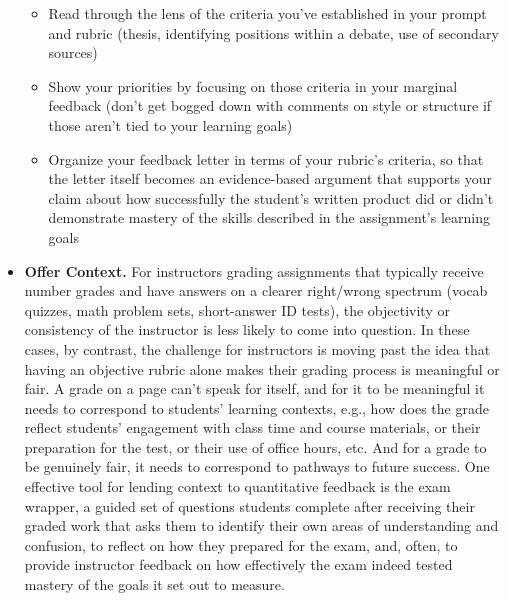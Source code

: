 \begin{itemize}
  \begin{itemize}
  \item Read through the lens of the criteria you’ve established in your prompt and rubric (thesis, identifying positions within a debate, use of secondary sources)
    
  \item Show your priorities by focusing on those criteria in your marginal feedback (don’t get bogged down with comments on style or structure if those aren’t tied to your learning goals)
    
  \item Organize your feedback letter in terms of your rubric’s criteria, so that the letter itself becomes an evidence-based argument that supports your claim about how successfully the student's written product  did or didn’t demonstrate mastery of the skills described in the assignment’s learning goals
  \end{itemize}
  
\item \textbf{Offer Context.} For instructors grading assignments that typically receive number grades and have answers on a clearer right/wrong spectrum (vocab quizzes, math problem sets, short-answer ID tests), the objectivity or consistency of the instructor is less likely to come into question. In these cases, by contrast, the challenge for instructors is moving past the idea that having an objective rubric alone makes their grading process is meaningful or fair. A grade on a page can’t speak for itself, and for it to be meaningful it needs to correspond to students’ learning contexts, e.g., how does the grade reflect students’ engagement with class time and course materials, or their preparation for the test, or their use of office hours, etc. And for a grade to be genuinely fair, it needs to correspond to pathways to future success. One effective tool for lending context to quantitative feedback is the exam wrapper, a guided set of questions students complete after receiving their graded work that asks them to identify their own areas of understanding and confusion, to reflect on how they prepared for the exam, and, often, to provide instructor feedback on how effectively the exam indeed tested mastery of the goals it set out to measure.

\end{itemize}

